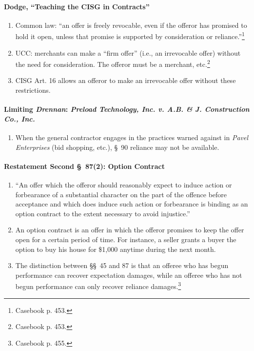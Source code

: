 \paragraph{Dodge, ``Teaching the CISG in Contracts''}

\begin{enumerate}
    \item Common law: ``an offer is freely revocable, even if the offeror has 
    promised to hold it open, unless that promise is supported by 
    consideration or reliance.''\footnote{Casebook p. 453.}
    \item UCC: merchants can make a ``firm offer'' (i.e., an irrevocable 
    offer) without the need for consideration. The offeror must be a merchant, 
    etc.\footnote{Casebook p. 453.}
    \item CISG Art. 16 allows an offeror to make an irrevocable offer without 
    these restrictions.
\end{enumerate}

\paragraph{Limiting \emph{Drennan}: \emph{Preload Technology, Inc. v. A.B. \& 
J. Construction Co., Inc.}}

\begin{enumerate}
    \item When the general contractor engages in the practices warned against 
    in \emph{Pavel Enterprises} (bid shopping, etc.), \S\ 90 reliance may not 
    be available.
\end{enumerate}

\paragraph{Restatement Second \S\ 87(2): Option Contract}

\begin{enumerate}
    \item ``An offer which the offeror should reasonably expect to induce 
    action or forbearance of a substantial character on the part of the 
    offence before acceptance and which does induce such action or forbearance 
    is binding as an option contract to the extent necessary to avoid 
    injustice.''
    \item An option contract is an offer in which the offeror promises to keep 
    the offer open for a certain period of time. For instance, a seller grants 
    a buyer the option to buy his house for \$1,000 anytime during the next 
    month.
    \item The distinction between \S\S\ 45 and 87 is that an offeree who has 
    begun performance can recover expectation damages, while an offeree who 
    has not begun performance can only recover reliance 
    damages.\footnote{Casebook p. 455.}
\end{enumerate}

